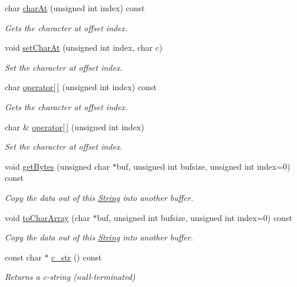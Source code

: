 \begin{DoxyCompactItemize}
char \hyperlink{class_string_aee512943b0a68596e1f946fcfda757af}{char\+At} (unsigned int index) const
\begin{DoxyCompactList}\small\item\em Gets the character at offset index. \end{DoxyCompactList}\item 
void \hyperlink{class_string_a000b7c7b89bbd326a9b966a79bc838e8}{set\+Char\+At} (unsigned int index, char c)
\begin{DoxyCompactList}\small\item\em Set the character at offset index. \end{DoxyCompactList}\item 
char \hyperlink{class_string_a277d6b29f7f152a03c81700b12e43e55}{operator\mbox{[}$\,$\mbox{]}} (unsigned int index) const
\begin{DoxyCompactList}\small\item\em Gets the character at offset index. \end{DoxyCompactList}\item 
char \& \hyperlink{class_string_a92a0681d0031d7e99c12c245cc22367e}{operator\mbox{[}$\,$\mbox{]}} (unsigned int index)
\begin{DoxyCompactList}\small\item\em Set the character at offset index. \end{DoxyCompactList}\item 
void \hyperlink{class_string_a507250e2de463e60e8df8fb5089f8dae}{get\+Bytes} (unsigned char $\ast$buf, unsigned int bufsize, unsigned int index=0) const
\begin{DoxyCompactList}\small\item\em Copy the data out of this \hyperlink{class_string}{String} into another buffer. \end{DoxyCompactList}\item 
void \hyperlink{class_string_ac090329c1967d6265d63cc0a5b850e23}{to\+Char\+Array} (char $\ast$buf, unsigned int bufsize, unsigned int index=0) const
\begin{DoxyCompactList}\small\item\em Copy the data out of this \hyperlink{class_string}{String} into another buffer. \end{DoxyCompactList}\item 
const char $\ast$ \hyperlink{class_string_a0274f3e61533d15086816fb7f47ccb54}{c\+\_\+str} () const
\begin{DoxyCompactList}\small\item\em Returns a c-\/string (null-\/terminated) \end{DoxyCompactList}\item 

\end{DoxyCompactItemize}

